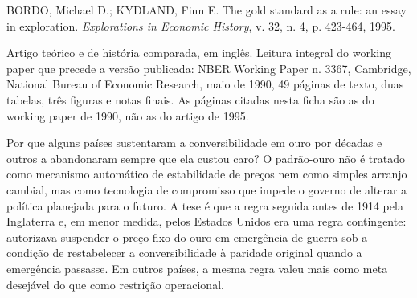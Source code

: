 
\begin{identificacao}
BORDO, Michael D.; KYDLAND, Finn E. The gold standard as a rule: an essay in
exploration. \textit{Explorations in Economic History}, v. 32, n. 4,
p. 423-464, 1995.

Artigo teórico e de história comparada, em inglês. Leitura integral do working
paper que precede a versão publicada: NBER Working Paper n. 3367, Cambridge,
National Bureau of Economic Research, maio de 1990, 49 páginas de texto, duas
tabelas, três figuras e notas finais. As páginas citadas nesta ficha são as do
working paper de 1990, não as do artigo de 1995.
\end{identificacao}

Por que alguns países sustentaram a conversibilidade em ouro por décadas e
outros a abandonaram sempre que ela custou caro? O padrão-ouro não é tratado
como mecanismo automático de estabilidade de preços nem como simples arranjo
cambial, mas como tecnologia de compromisso que impede o governo de alterar a
política planejada para o futuro. A tese é que a regra seguida antes de 1914
pela Inglaterra e, em menor medida, pelos Estados Unidos era uma regra
contingente: autorizava suspender o preço fixo do ouro em emergência de guerra
sob a condição de restabelecer a conversibilidade à paridade original quando a
emergência passasse. Em outros países, a mesma regra valeu mais como meta
desejável do que como restrição operacional.

